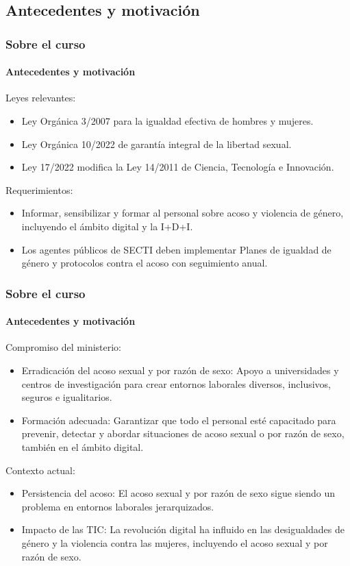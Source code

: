 \documentclass{beamer}
\newcommand{\highlight}[1]{{\color{Blue} #1}}
\begin{document}
    \subsection{Antecedentes y motivación}

    \begin{frame}
        \frametitle{Sobre el curso}
        \framesubtitle{Antecedentes y motivación}
        Leyes relevantes:
        \begin{itemize}
            \item \highlight{Ley Orgánica 3/2007} para la igualdad efectiva de hombres y mujeres.
            \item \highlight{Ley Orgánica 10/2022} de garantía integral de la libertad sexual.
            \item \highlight{Ley 17/2022} modifica la Ley 14/2011 de Ciencia, Tecnología e Innovación.
        \end{itemize}
        Requerimientos:
        \begin{itemize}
            \item \highlight{Informar, sensibilizar y formar} al personal sobre acoso y violencia de género, incluyendo el ámbito digital y la I+D+I.
            \item Los agentes públicos de SECTI deben implementar \highlight{Planes de igualdad de género} y protocolos contra el acoso con seguimiento anual.
        \end{itemize}
    \end{frame}

    \begin{frame}
        \frametitle{Sobre el curso}
        \framesubtitle{Antecedentes y motivación}
        Compromiso del ministerio:
        \begin{itemize}
            \item \highlight{Erradicación del acoso sexual y por razón de sexo}: Apoyo a universidades y centros de investigación para crear entornos laborales diversos, inclusivos, seguros e igualitarios.
            \item \highlight{Formación adecuada}: Garantizar que todo el personal esté capacitado para prevenir, detectar y abordar situaciones de acoso sexual o por razón de sexo, también en el ámbito digital.
        \end{itemize}
        Contexto actual:
        \begin{itemize}
            \item \highlight{Persistencia del acoso}: El acoso sexual y por razón de sexo sigue siendo un problema en entornos laborales jerarquizados.
            \item \highlight{Impacto de las TIC}: La revolución digital ha influido en las desigualdades de género y la violencia contra las mujeres, incluyendo el acoso sexual y por razón de sexo.
        \end{itemize}
    \end{frame}
\end{document}

